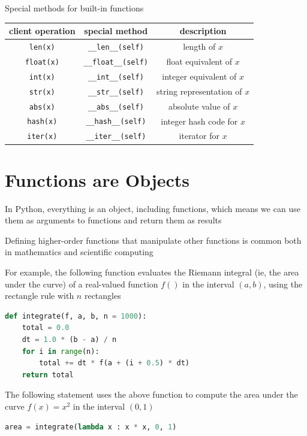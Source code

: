\documentclass[8pt,a4paper,compress]{beamer}
\begin{document}
\begin{frame}[fragile]
\pause

Special methods for built-in functions
\begin{center}
\begin{tabular}{ccc}
client operation & special method & description \\ \hline
\lstinline$len(x)$ & \lstinline$__len__(self)$ & length of $x$ \\
\lstinline$float(x)$ & \lstinline$__float__(self)$ & float equivalent of $x$ \\
\lstinline$int(x)$ & \lstinline$__int__(self)$ & integer equivalent of $x$ \\
\lstinline$str(x)$ & \lstinline$__str__(self)$ & string representation of $x$ \\
\lstinline$abs(x)$ & \lstinline$__abs__(self)$ & absolute value of $x$ \\
\lstinline$hash(x)$ & \lstinline$__hash__(self)$ & integer hash code for $x$ \\
\lstinline$iter(x)$ & \lstinline$__iter__(self)$ & iterator for $x$
\end{tabular} 
\end{center}
\end{frame}

\section{Functions are Objects}
\begin{frame}[fragile]
\pause

In Python, everything is an object, including functions, which means we can use them as arguments to functions and return them as results

\pause
\bigskip

Defining higher-order functions that manipulate other functions is common both in mathematics and scientific computing

\pause
\bigskip

For example, the following function evaluates the Riemann integral (ie, the area under the curve) of a real-valued function $f()$ in the interval $(a, b)$, using the rectangle rule with $n$ rectangles

\begin{lstlisting}[language=Python]
def integrate(f, a, b, n = 1000):
    total = 0.0
    dt = 1.0 * (b - a) / n
    for i in range(n):
        total += dt * f(a + (i + 0.5) * dt)
    return total
\end{lstlisting}

\pause
\bigskip

The following statement uses the above function to compute the area under the curve $f(x)=x^2$ in the interval $(0, 1)$

\begin{lstlisting}[language=Python]
area = integrate(lambda x : x * x, 0, 1)
\end{lstlisting}
\end{frame}
\end{document}
